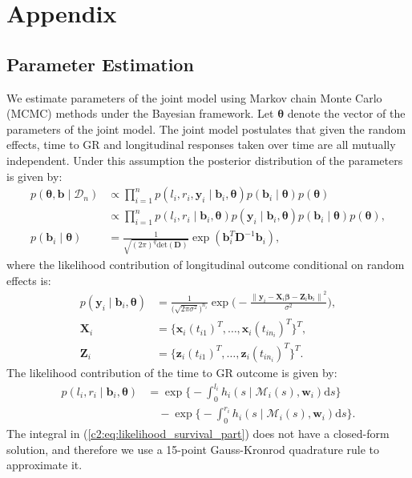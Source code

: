 \section*{Appendix}

\begin{subappendices}
\section{Parameter Estimation}
\label{c2:appendix:A}
We estimate parameters of the joint model using Markov chain Monte Carlo (MCMC) methods under the Bayesian framework. Let $\boldsymbol{\theta}$ denote the vector of the parameters of the joint model. The joint model postulates that given the random effects, time to GR and longitudinal responses taken over time are all mutually independent. Under this assumption the posterior distribution of the parameters is given by:
\begin{align*}
p(\boldsymbol{\theta}, \boldsymbol{b} \mid \mathcal{D}_n) & \propto \prod_{i=1}^n p(l_i, r_i, \boldsymbol{y}_i \mid \boldsymbol{b}_i, \boldsymbol{\theta}) p(\boldsymbol{b}_i \mid \boldsymbol{\theta}) p(\boldsymbol{\theta})\\
& \propto \prod_{i=1}^n p(l_i, r_i \mid \boldsymbol{b}_i, \boldsymbol{\theta}) p(\boldsymbol{y}_i \mid \boldsymbol{b}_i, \boldsymbol{\theta}) p(\boldsymbol{b}_i \mid \boldsymbol{\theta}) p(\boldsymbol{\theta}),\\
p(\boldsymbol{b}_i \mid \boldsymbol{\theta}) &= \frac{1}{\sqrt{(2 \pi)^q \text{det}(\boldsymbol{D})}} \exp(\boldsymbol{b}_i^T \boldsymbol{D}^{-1} \boldsymbol{b}_i),
\end{align*}
where the likelihood contribution of longitudinal outcome conditional on random effects is:
\begin{align*}
p(\boldsymbol{y}_i \mid \boldsymbol{b}_i, \boldsymbol{\theta}) &= \frac{1}{\big(\sqrt{2 \pi \sigma^2}\big)^{n_i}} \exp\bigg(-\frac{{\lVert{\boldsymbol{y}_i - \boldsymbol{X}_i\boldsymbol{\beta} - \boldsymbol{Z}_i\boldsymbol{b}_i}\rVert}^2}{\sigma^2}\bigg),\\
\boldsymbol{X}_i &= \{\boldsymbol{x}_i(t_{i1})^T, \ldots, \boldsymbol{x}_i(t_{in_i})^T\}^T,\\
\boldsymbol{Z}_i &= \{\boldsymbol{z}_i(t_{i1})^T, \ldots, \boldsymbol{z}_i(t_{in_i})^T\}^T.
\end{align*}
The likelihood contribution of the time to GR outcome is given by:
\begin{equation}
\label{c2:eq:likelihood_survival_part}
\begin{split}
p(l_i,r_i\mid \boldsymbol{b}_i,\boldsymbol{\theta}) &= \exp\Big\{-\int_0^{l_i} h_i(s \mid \mathcal{M}_i(s), \boldsymbol{w}_i)\mathrm{d}{s}\Big\} \\ & \quad - \exp\Big\{-\int_0^{r_i}h_i(s \mid \mathcal{M}_i(s), \boldsymbol{w}_i)\mathrm{d}{s}\Big\}.
\end{split}
\end{equation}
The integral in (\ref{c2:eq:likelihood_survival_part}) does not have a closed-form solution, and therefore we use a 15-point Gauss-Kronrod quadrature rule to approximate it.


\end{subappendices}
